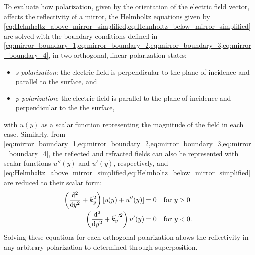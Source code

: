 To evaluate how polarization, given by the orientation of the electric field vector, affects the reflectivity of a mirror, the Helmholtz equations given by \cref{eq:Helmholtz_above_mirror_simplified,eq:Helmholtz_below_mirror_simplified} are solved with the boundary conditions defined in \cref{eq:mirror_boundary_1,eq:mirror_boundary_2,eq:mirror_boundary_3,eq:mirror_boundary_4}, in two orthogonal, linear polarization states:
\begin{itemize}[noitemsep]
  \item \emph{s-polarization}: the electric field is perpendicular to the plane of incidence and parallel to the surface, and 
  \item \emph{p-polarization}: the electric field is parallel to the plane of incidence and perpendicular to the the surface, 
\end{itemize}
with $u(y)$ as a scalar function representing the magnitude of the field in each case. 
Similarly, from \cref{eq:mirror_boundary_1,eq:mirror_boundary_2,eq:mirror_boundary_3,eq:mirror_boundary_4}, the reflected and refracted fields can also be represented with scalar functions $u''(y)$ and $u'(y)$, respectively, and \cref{eq:Helmholtz_above_mirror_simplified,eq:Helmholtz_below_mirror_simplified} are reduced to their scalar form:
\begin{subequations}
\begin{align}
 \left( \dv[2]{y} + k_y^2 \right) \left[ u(y) + u''(y)  \right] &= 0 \quad \text{for $y>0$} \\
 \left( \dv[2]{y} + \tilde{k_y}'^2 \right) u'(y) &= 0 \quad \text{for $y<0$} .
  \end{align}
 \end{subequations}
Solving these equations for each orthogonal polarization allows the reflectivity in any arbitrary polarization to determined through superposition. 

